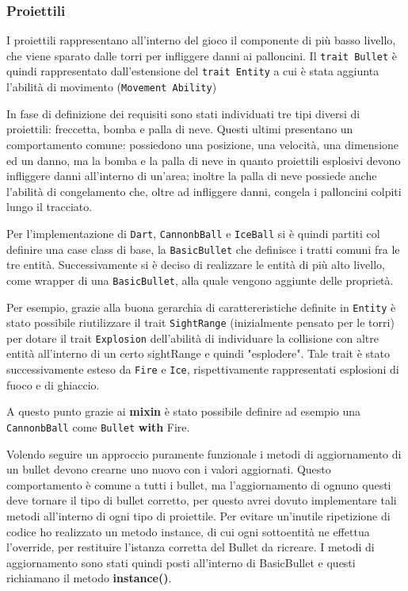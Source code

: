 \subsubsection{Proiettili}
I proiettili rappresentano all'interno del gioco il componente di più basso livello, che viene sparato dalle torri
per infliggere danni ai palloncini. Il \texttt{trait Bullet} è quindi rappresentato dall'estensione del
\texttt{trait Entity} a cui è stata aggiunta l'abilità di movimento (\texttt{Movement Ability})

In fase di definizione dei requisiti sono stati individuati tre tipi diversi di proiettili: freccetta, bomba e palla di neve.
Questi ultimi presentano un comportamento comune: possiedono una posizione, una velocità, una dimensione ed un danno, ma
la bomba e la palla di neve in quanto proiettili esplosivi devono infliggere danni all'interno di un'area; inoltre
la palla di neve possiede anche l'abilità di congelamento che, oltre ad infliggere danni, congela i palloncini colpiti
lungo il tracciato.

Per l'implementazione di \texttt{Dart}, \texttt{CannonbBall} e \texttt{IceBall} si è quindi partiti col definire una case class
di base, la \texttt{BasicBullet} che definisce i tratti comuni fra le tre entità. Successivamente si è deciso di realizzare
le entità di più alto livello, come wrapper di una \texttt{BasicBullet}, alla quale vengono aggiunte delle proprietà.

Per esempio, grazie alla buona gerarchia di carattereristiche definite in \texttt{Entity} è stato possibile riutilizzare
il trait \texttt{SightRange} (inizialmente pensato per le torri) per dotare il trait \texttt{Explosion} dell'abilità di
individuare la collisione con altre entità all'interno di un certo sightRange e quindi "esplodere". Tale trait è stato
successivamente esteso da \texttt{Fire} e \texttt{Ice}, rispettivamente rappresentati esplosioni di fuoco e di ghiaccio.

A questo punto grazie ai \textbf{mixin} è stato possibile definire ad esempio una \texttt{CannonbBall} come
\texttt{Bullet} \textbf{with} Fire.

Volendo seguire un approccio puramente funzionale i metodi di aggiornamento di un bullet devono crearne uno nuovo
con i valori aggiornati. Questo comportamento è comune a tutti i bullet, ma l'aggiornamento
di ognuno questi deve tornare il tipo di bullet corretto, per questo avrei dovuto implementare tali
metodi all'interno di ogni tipo di proiettile. Per evitare un'inutile ripetizione
di codice ho realizzato un metodo instance, di cui ogni sottoentità ne effettua l'override, per restituire l'istanza
corretta del Bullet da ricreare. I metodi di aggiornamento sono stati quindi posti all'interno di BasicBullet e questi
richiamano il metodo \textbf{instance()}.

